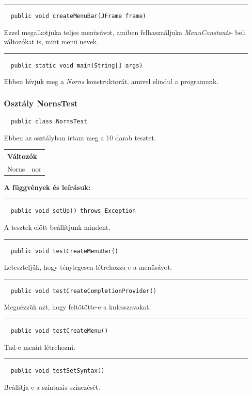\documentclass[12pt]{article}
\newcommand{\fuggveny}{\textbf{A függvények és leírásuk: \\}}
\newcommand{\vonal}{\noindent\rule{\textwidth}{1pt}}
\begin{document}
\vonal
\begin{lstlisting}
  public void createMenuBar(JFrame frame)
\end{lstlisting}
Ezzel megalkotjuka  teljes menüsávot, amiben felhasználjuka \textit{MenuConstants}-
beli változókat is, mint menü nevek.

\vonal
\begin{lstlisting}
  public static void main(String[] args)
\end{lstlisting}
Ebben hívjuk meg a \textit{Norns} konstruktorát, amivel elindul a programunk.

\subsubsection*{Osztály NornsTest}
\begin{lstlisting}
  public class NornsTest
\end{lstlisting}
Ebben az osztályban írtam meg a 10 darab tesztet.

\begin{longtable}{|p{5cm}|p{10cm}|} \hline
    \multicolumn{2}{|p{15cm}|}{\textbf{Változók}}  \\ \hline
    Norns & nor \\ \hline
\end{longtable}

\fuggveny
\vonal
\begin{lstlisting}
  public void setUp() throws Exception
\end{lstlisting}
A tesztek előtt beállítjunk mindent.

\vonal %
\begin{lstlisting}
  public void testCreateMenuBar()
\end{lstlisting}
Leteszteljük, hogy ténylegesen létrehozza-e a menüsávot.

\vonal %
\begin{lstlisting}
  public void testCreateCompletionProvider()
\end{lstlisting}
Megnézzük azt, hogy feltötötte-e a kulcsszavakat.

\vonal %
\begin{lstlisting}
  public void testCreateMenu()
\end{lstlisting}
Tud-e menüt létrehozni.

\vonal %
\begin{lstlisting}
  public void testSetSyntax()
\end{lstlisting}
Beállítja-e a szintaxis színezését.
\end{document}
